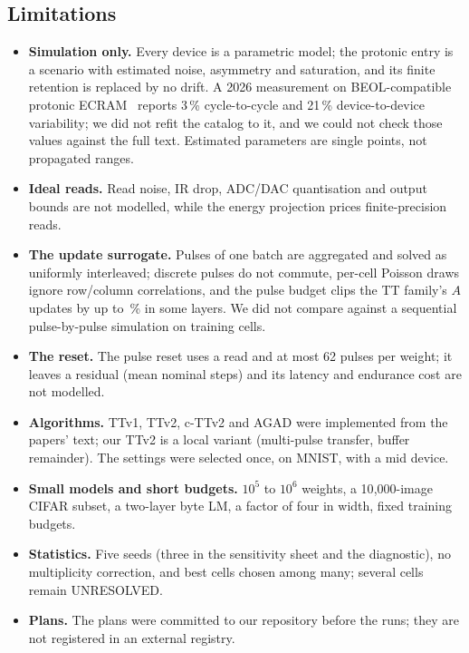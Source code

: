 \subsection{Limitations}\label{sec:limits}
\begin{itemize}
\item \textbf{Simulation only.} Every device is a parametric model; the protonic entry is a scenario with estimated noise,
      asymmetry and saturation, and its finite retention is replaced by no drift. A 2026 measurement on BEOL-compatible
      protonic ECRAM~\cite{xu2026} reports 3\,\% cycle-to-cycle and 21\,\% device-to-device variability; we did not refit the
      catalog to it, and we could not check those values against the full text. Estimated parameters are single points, not
      propagated ranges.
\item \textbf{Ideal reads.} Read noise, IR drop, ADC/DAC quantisation and output bounds are not modelled, while the energy
      projection prices finite-precision reads.
\item \textbf{The update surrogate.} Pulses of one batch are aggregated and solved as uniformly interleaved; discrete pulses do
      not commute, per-cell Poisson draws ignore row/column correlations, and the pulse budget clips the TT family's $A$
      updates by up to \RVLostCifarTtLayerMeanMaxPct\,\% in some layers. We did not compare against a sequential pulse-by-pulse
      simulation on training cells.
\item \textbf{The reset.} The pulse reset uses a read and at most 62 pulses per weight; it leaves a residual (mean
      \RVResetResidMean{} nominal steps) and its latency and endurance cost are not modelled.
\item \textbf{Algorithms.} TTv1, TTv2, c-TTv2 and AGAD were implemented from the papers' text; our TTv2 is a local variant
      (multi-pulse transfer, buffer remainder). The settings were selected once, on MNIST, with a mid device.
\item \textbf{Small models and short budgets.} $10^5$ to $10^6$ weights, a 10{,}000-image CIFAR subset, a two-layer byte LM,
      a factor of four in width, fixed training budgets.
\item \textbf{Statistics.} Five seeds (three in the sensitivity sheet and the diagnostic), no multiplicity correction, and best
      cells chosen among many; several cells remain UNRESOLVED.
\item \textbf{Plans.} The plans were committed to our repository before the runs; they are not registered in an external
      registry.
\end{itemize}
